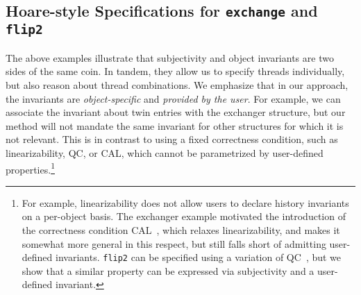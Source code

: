 \subsection{Hoare-style Specifications for \texttt{exchange} and
  \texttt{flip2}}
\label{sec:hoare}

The above examples illustrate that subjectivity and object invariants
are two sides of the same coin. In tandem, they allow us to specify
threads individually, but also reason about thread combinations. We
emphasize that in our approach, the invariants are
\emph{object-specific} and \emph{provided by the user}. For example,
we can associate the invariant about twin entries with the exchanger
structure, but our method will not mandate the same invariant for
other structures for which it is not relevant. This is in contrast to
using a fixed correctness condition, such as linearizability, QC, or
CAL, which cannot be parametrized by user-defined
properties.\footnote{For example, linearizability does not allow users
  to declare history invariants on a per-object basis. The exchanger
  example motivated the introduction of the correctness condition
  CAL~\cite{Hemed-Rinetzky:PODC14}, which relaxes linearizability, and
  makes it somewhat more general in this respect, but still falls
  short of admitting user-defined invariants. \texttt{flip2} can be
  specified using a variation of QC~\cite{Jagadeesan-Riely:ICALP14},
  but we show that a similar property can be expressed via
  subjectivity and a user-defined invariant.}




